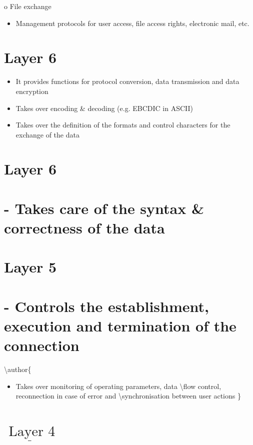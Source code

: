 \documentclass[10pt]{article}
\begin{document}
o File exchange

\begin{itemize}
  \item Management protocols for user access, file access rights, electronic mail, etc.
\end{itemize}

\section{Layer 6}
\begin{itemize}
  \item It provides functions for protocol conversion, data transmission and data encryption

  \item Takes over encoding \& decoding (e.g. EBCDIC in ASCII)

  \item Takes over the definition of the formats and control characters for the exchange of the data

\end{itemize}

\section{Layer 6}
\section{- Takes care of the syntax \& correctness of the data}
\section*{Layer 5 }
\section{- Controls the establishment, execution and termination of the connection}
\textbackslash author\{

\begin{itemize}
  \item Takes over monitoring of operating parameters, data \textbackslash  flow control, reconnection in case of error and \textbackslash  synchronisation between user actions
\}
\end{itemize}

\section{$\underline{\text { Layer } 4}$}
\end{document}

